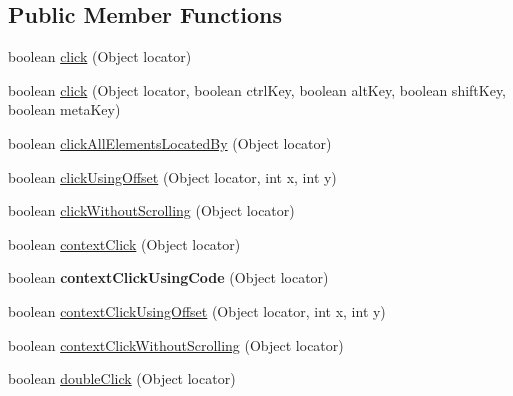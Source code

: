 \subsection*{Public Member Functions}
\begin{DoxyCompactItemize}
\item 
boolean \hyperlink{interfacecom_1_1zeuslearning_1_1automation_1_1interactions_1_1IMouseOperations_a644236cb97197227ac80084abb3d95b0}{click} (Object locator)
\item 
boolean \hyperlink{interfacecom_1_1zeuslearning_1_1automation_1_1interactions_1_1IMouseOperations_aacf192b585aefaf99d61f34f68b841e4}{click} (Object locator, boolean ctrl\+Key, boolean alt\+Key, boolean shift\+Key, boolean meta\+Key)
\item 
boolean \hyperlink{interfacecom_1_1zeuslearning_1_1automation_1_1interactions_1_1IMouseOperations_ae69ce579fb3bc0d0e8259f041600d091}{click\+All\+Elements\+Located\+By} (Object locator)
\item 
boolean \hyperlink{interfacecom_1_1zeuslearning_1_1automation_1_1interactions_1_1IMouseOperations_a76821e7ed6d7ca57f9466546e80a1679}{click\+Using\+Offset} (Object locator, int x, int y)
\item 
boolean \hyperlink{interfacecom_1_1zeuslearning_1_1automation_1_1interactions_1_1IMouseOperations_a0a40b7faf1ddcc224debbe0c51526a4e}{click\+Without\+Scrolling} (Object locator)
\item 
boolean \hyperlink{interfacecom_1_1zeuslearning_1_1automation_1_1interactions_1_1IMouseOperations_aa9b50c75a45f8c91063ba22a985614ca}{context\+Click} (Object locator)
\item 
\hypertarget{interfacecom_1_1zeuslearning_1_1automation_1_1interactions_1_1IMouseOperations_a204a2c7b81b0d007405e3df142efd83e}{}\label{interfacecom_1_1zeuslearning_1_1automation_1_1interactions_1_1IMouseOperations_a204a2c7b81b0d007405e3df142efd83e} 
boolean {\bfseries context\+Click\+Using\+Code} (Object locator)
\item 
boolean \hyperlink{interfacecom_1_1zeuslearning_1_1automation_1_1interactions_1_1IMouseOperations_abc12dd95f19a0f53ae83a97dbfb7b001}{context\+Click\+Using\+Offset} (Object locator, int x, int y)
\item 
boolean \hyperlink{interfacecom_1_1zeuslearning_1_1automation_1_1interactions_1_1IMouseOperations_a3db4879fa0f0848438b676769b352eec}{context\+Click\+Without\+Scrolling} (Object locator)
\item 
boolean \hyperlink{interfacecom_1_1zeuslearning_1_1automation_1_1interactions_1_1IMouseOperations_afa934246038ce6ec851e5ec765a1fb5a}{double\+Click} (Object locator)

\end{DoxyCompactItemize}
